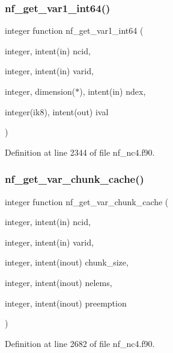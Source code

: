 \subsubsection{\texorpdfstring{nf\+\_\+get\+\_\+var1\+\_\+int64()}{nf\_get\_var1\_int64()}}
{\footnotesize\ttfamily integer function nf\+\_\+get\+\_\+var1\+\_\+int64 (\begin{DoxyParamCaption}\item[{integer, intent(in)}]{ncid,  }\item[{integer, intent(in)}]{varid,  }\item[{integer, dimension($\ast$), intent(in)}]{ndex,  }\item[{integer(ik8), intent(out)}]{ival }\end{DoxyParamCaption})}



Definition at line 2344 of file nf\+\_\+nc4.\+f90.

\mbox{\label{nf__nc4_8f90_ad6e13392d9e86ada0aea68af09e82288}} 
\subsubsection{\texorpdfstring{nf\+\_\+get\+\_\+var\+\_\+chunk\+\_\+cache()}{nf\_get\_var\_chunk\_cache()}}
{\footnotesize\ttfamily integer function nf\+\_\+get\+\_\+var\+\_\+chunk\+\_\+cache (\begin{DoxyParamCaption}\item[{integer, intent(in)}]{ncid,  }\item[{integer, intent(in)}]{varid,  }\item[{integer, intent(inout)}]{chunk\+\_\+size,  }\item[{integer, intent(inout)}]{nelems,  }\item[{integer, intent(inout)}]{preemption }\end{DoxyParamCaption})}



Definition at line 2682 of file nf\+\_\+nc4.\+f90.

\mbox{\label{nf__nc4_8f90_aa3f48742fd7afbe9255290dfabcc6657}} 

